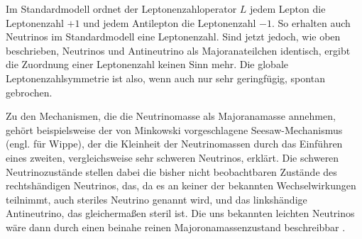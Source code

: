 Im Standardmodell ordnet der Leptonenzahloperator $L$ jedem Lepton die Leptonenzahl $+1$ und jedem Antilepton die Leptonenzahl $-1$.
So erhalten auch Neutrinos im Standardmodell eine Leptonenzahl. 
Sind jetzt jedoch, wie oben beschrieben, Neutrinos und Antineutrino als Majoranateilchen identisch, ergibt die Zuordnung einer Leptonenzahl keinen Sinn mehr.
Die globale Leptonenzahlsymmetrie ist also, wenn auch nur sehr geringfügig, spontan gebrochen.

Zu den Mechanismen, die die Neutrinomasse als Majoranamasse annehmen, gehört beispielsweise der von Minkowski vorgeschlagene Seesaw-Mechanismus (engl. für Wippe), der die Kleinheit der Neutrinomassen durch das
Einführen eines zweiten, vergleichsweise sehr schweren Neutrinos, erklärt.
Die schweren Neutrinozustände stellen dabei die bisher nicht beobachtbaren Zustände des rechtshändigen Neutrinos, das, da es an keiner der bekannten Wechselwirkungen teilnimmt, auch steriles Neutrino genannt wird,
und das linkshändige Antineutrino, das gleichermaßen steril ist.
Die uns bekannten leichten Neutrinos wäre dann durch einen beinahe reinen Majoronamassenzustand beschreibbar \cite[Kap. 1.6.5]{kleingrot}.











